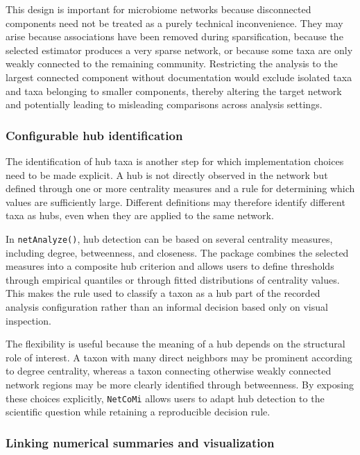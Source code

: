 This design is important for microbiome networks because disconnected components need not be treated as a purely technical inconvenience. They may arise because associations have been removed during sparsification, because the selected estimator produces a very sparse network, or because some taxa are only weakly connected to the remaining community. Restricting the analysis to the largest connected component without documentation would exclude isolated taxa and taxa belonging to smaller components, thereby altering the target network and potentially leading to misleading comparisons across analysis settings.

\subsubsection{Configurable hub identification}

The identification of hub taxa is another step for which implementation choices need to be made explicit. A hub is not directly observed in the network but defined through one or more centrality measures and a rule for determining which values are sufficiently large. Different definitions may therefore identify different taxa as hubs, even when they are applied to the same network.

In \texttt{netAnalyze()}, hub detection can be based on several centrality measures, including degree, betweenness, and closeness. The package combines the selected measures into a composite hub criterion and allows users to define thresholds through empirical quantiles or through fitted distributions of centrality values. This makes the rule used to classify a taxon as a hub part of the recorded analysis configuration rather than an informal decision based only on visual inspection.

The flexibility is useful because the meaning of a hub depends on the structural role of interest. A taxon with many direct neighbors may be prominent according to degree centrality, whereas a taxon connecting otherwise weakly connected network regions may be more clearly identified through betweenness. By exposing these choices explicitly, \texttt{NetCoMi} allows users to adapt hub detection to the scientific question while retaining a reproducible decision rule.

\subsubsection{Linking numerical summaries and visualization}

